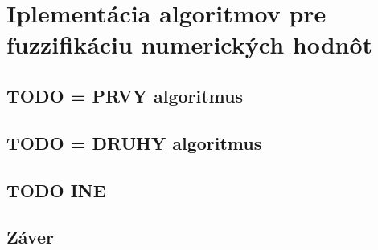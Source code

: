 \chapter{Iplementácia algoritmov pre fuzzifikáciu numerických hodnôt} 

\section{TODO = PRVY algoritmus }

\section{TODO = DRUHY algoritmus}

\section{TODO INE }

\section{Záver}